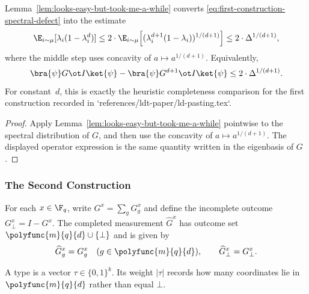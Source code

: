 \begin{corollary}\label{cor:first-construction-completeness-comparison}
	Lemma~\ref{lem:looks-easy-but-took-me-a-while} converts
	\eqref{eq:first-construction-spectral-defect} into the estimate
	\[
		\E_{i\sim\mu}[\lambda_i(1-\lambda_i^d)]
		\le 2\cdot \E_{i\sim\mu}\Big[(\lambda_i^{d+1}(1-\lambda_i))^{1/(d+1)}\Big]
		\le 2\cdot \Delta^{1/(d+1)},
	\]
	where the middle step uses concavity of $a \mapsto a^{1/(d+1)}$. Equivalently,
	\[
		\bra{\psi} G \ot I \ket{\psi} - \bra{\psi} G^{d+1} \ot I \ket{\psi}
		\le 2\cdot \Delta^{1/(d+1)}.
	\]
	For constant~$d$, this is exactly the heuristic completeness comparison for the
	first construction recorded in `references/ldt-paper/ld-pasting.tex`.
\end{corollary}
\begin{proof}
	Apply Lemma~\ref{lem:looks-easy-but-took-me-a-while} pointwise to the
	spectral distribution of \(G\), and then use the concavity of
	\(a \mapsto a^{1/(d+1)}\). The displayed operator expression is the same
	quantity written in the eigenbasis of \(G\).
\end{proof}

\subsubsection{The Second Construction}\label{sec:second-construction}

\begin{definition}\label{def:G-hat}
	\leanok
	For each $x \in \F_q$, write $G^x = \sum_g G_g^x$ and define the incomplete outcome $G_\bot^x = I-G^x$. The completed measurement $\widehat G^x$ has outcome set $\polyfunc{m}{q}{d} \cup \{\bot\}$ and is given by
	\[
		\widehat G_g^x = G_g^x \quad (g \in \polyfunc{m}{q}{d}),
		\qquad
		\widehat G_\bot^x = G_\bot^x.
	\]
\end{definition}

\begin{definition}[Types]\label{def:types}
	\leanok
	A type is a vector $\tau \in \{0,1\}^k$. Its weight $|\tau|$ records how many coordinates lie in $\polyfunc{m}{q}{d}$ rather than equal $\bot$.
\end{definition}

